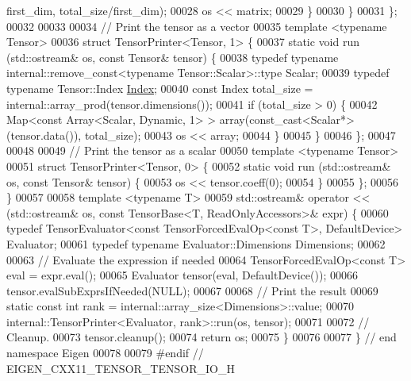 \begin{DoxyCode}
      first\_dim, total\_size/first\_dim);
00028       os << matrix;
00029     \}
00030   \}
00031 \};
00032 
00033 
00034 \textcolor{comment}{// Print the tensor as a vector}
00035 \textcolor{keyword}{template} <\textcolor{keyword}{typename} Tensor>
00036 \textcolor{keyword}{struct }TensorPrinter<Tensor, 1> \{
00037   \textcolor{keyword}{static} \textcolor{keywordtype}{void} run (std::ostream& os, \textcolor{keyword}{const} Tensor& tensor) \{
00038     \textcolor{keyword}{typedef} \textcolor{keyword}{typename} internal::remove\_const<typename Tensor::Scalar>::type Scalar;
00039     \textcolor{keyword}{typedef} \textcolor{keyword}{typename} Tensor::Index \hyperlink{namespace_eigen_a62e77e0933482dafde8fe197d9a2cfde}{Index};
00040     \textcolor{keyword}{const} Index total\_size = internal::array\_prod(tensor.dimensions());
00041     \textcolor{keywordflow}{if} (total\_size > 0) \{
00042       Map<const Array<Scalar, Dynamic, 1> > array(const\_cast<Scalar*>(tensor.data()), total\_size);
00043       os << array;
00044     \}
00045   \}
00046 \};
00047 
00048 
00049 \textcolor{comment}{// Print the tensor as a scalar}
00050 \textcolor{keyword}{template} <\textcolor{keyword}{typename} Tensor>
00051 \textcolor{keyword}{struct }TensorPrinter<Tensor, 0> \{
00052   \textcolor{keyword}{static} \textcolor{keywordtype}{void} run (std::ostream& os, \textcolor{keyword}{const} Tensor& tensor) \{
00053     os << tensor.coeff(0);
00054   \}
00055 \};
00056 \}
00057 
00058 \textcolor{keyword}{template} <\textcolor{keyword}{typename} T>
00059 std::ostream& operator << (std::ostream& os, const TensorBase<T, ReadOnlyAccessors>& expr) \{
00060   \textcolor{keyword}{typedef} TensorEvaluator<const TensorForcedEvalOp<const T>, DefaultDevice> Evaluator;
00061   \textcolor{keyword}{typedef} \textcolor{keyword}{typename} Evaluator::Dimensions Dimensions;
00062 
00063   \textcolor{comment}{// Evaluate the expression if needed}
00064   TensorForcedEvalOp<const T> eval = expr.eval();
00065   Evaluator tensor(eval, DefaultDevice());
00066   tensor.evalSubExprsIfNeeded(NULL);
00067 
00068   \textcolor{comment}{// Print the result}
00069   \textcolor{keyword}{static} \textcolor{keyword}{const} \textcolor{keywordtype}{int} rank = internal::array\_size<Dimensions>::value;
00070   internal::TensorPrinter<Evaluator, rank>::run(os, tensor);
00071 
00072   \textcolor{comment}{// Cleanup.}
00073   tensor.cleanup();
00074   \textcolor{keywordflow}{return} os;
00075 \}
00076 
00077 \} \textcolor{comment}{// end namespace Eigen}
00078 
00079 \textcolor{preprocessor}{#endif // EIGEN\_CXX11\_TENSOR\_TENSOR\_IO\_H}
\end{DoxyCode}
